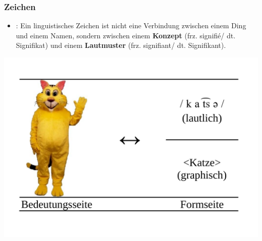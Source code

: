\begin{frame} \frametitle{Zeichen}

\begin{itemize}
	\item \citet{Saussure16x}: Ein linguistisches Zeichen ist nicht eine Verbindung zwischen einem Ding und einem Namen, sondern zwischen einem \textbf{Konzept} (frz. signifié/ dt. Signifikat) und einem \textbf{Lautmuster} (frz. signifiant/ dt. Signifikant).
\end{itemize}	

\begin{center}
	\includegraphics[scale=.2]{material/01SSZeichenKatze}	
\end{center}

\end{frame}	


